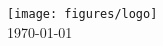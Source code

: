 \begin{titlepage}
\texttt{[image: figures/logo]}\\[1cm]

\vspace{1 cm}
{\large \today}\\[3cm] %


\vfill %

\end{titlepage}
